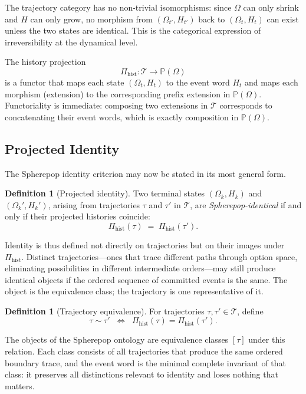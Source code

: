 \documentclass[12pt]{article}
\theoremstyle{plain}
\theoremstyle{definition}
\newtheorem{definition}[theorem]{Definition}
\theoremstyle{remark}
\newcommand{\PathCat}{\mathbb{P}(\Omega)}
\begin{document}
The trajectory category has no non-trivial isomorphisms: since $\Omega$ can only
shrink and $H$ can only grow, no morphism from $(\Omega_{t'}, H_{t'})$ back to
$(\Omega_t, H_t)$ can exist unless the two states are identical.  This is the
categorical expression of irreversibility at the dynamical level.

The history projection
\[
  \Pi_{\mathrm{hist}} : \mathcal{T} \longrightarrow \PathCat
\]
is a functor that maps each state $(\Omega_t, H_t)$ to the event word $H_t$ and
maps each morphism (extension) to the corresponding prefix extension in
$\PathCat$.  Functoriality is immediate: composing two extensions in
$\mathcal{T}$ corresponds to concatenating their event words, which is exactly
composition in $\PathCat$.

\subsection{Projected Identity}

The Spherepop identity criterion may now be stated in its most general form.

\begin{definition}[Projected identity]
\label{def:projected-identity}
Two terminal states $(\Omega_k, H_k)$ and $(\Omega_k', H_k')$, arising from
trajectories $\tau$ and $\tau'$ in $\mathcal{T}$, are \emph{Spherepop-identical}
if and only if their projected histories coincide:
\[
  \Pi_{\mathrm{hist}}(\tau) \;=\; \Pi_{\mathrm{hist}}(\tau').
\]
\end{definition}

Identity is thus defined not directly on trajectories but on their images under
$\Pi_{\mathrm{hist}}$.  Distinct trajectories---ones that trace different paths
through option space, eliminating possibilities in different intermediate
orders---may still produce identical objects if the ordered sequence of
committed events is the same.  The object is the equivalence class; the
trajectory is one representative of it.

\begin{definition}[Trajectory equivalence]
For trajectories $\tau, \tau' \in \mathcal{T}$, define
\[
  \tau \sim \tau'
  \;\;\Longleftrightarrow\;\;
  \Pi_{\mathrm{hist}}(\tau) = \Pi_{\mathrm{hist}}(\tau').
\]
\end{definition}

The objects of the Spherepop ontology are equivalence classes $[\tau]$ under
this relation.  Each class consists of all trajectories that produce the same
ordered boundary trace, and the event word is the minimal complete invariant of
that class: it preserves all distinctions relevant to identity and loses nothing
that matters.
\end{document}
